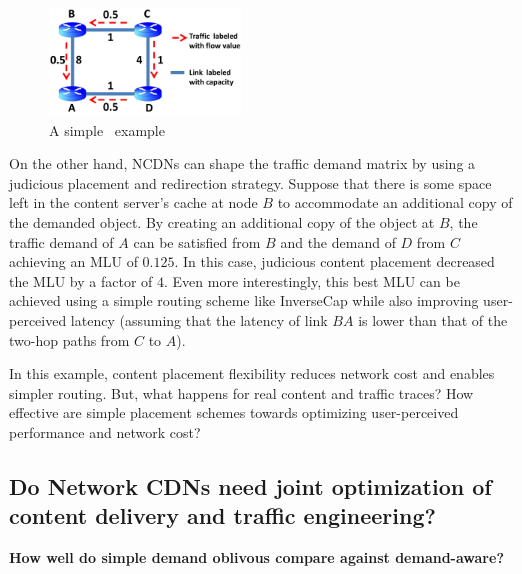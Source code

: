 \begin{figure}[h]
	\centering
	\includegraphics[width=2in]{ncdnpaper/ncdn-example}
	\caption{A simple \ncp\ example}
	\vspace{-.3in}
	\label{fig:NetworkExample}
\end{figure}


On the other hand, NCDNs can shape the traffic demand matrix by using a judicious placement and redirection strategy. Suppose that there is some space left in the content server's cache at node $B$ to accommodate an additional copy of the demanded object. By creating an additional copy of the object at $B$, the traffic demand of $A$ can be satisfied from $B$ and the demand of $D$ from $C$ achieving an MLU of $0.125$. In this case, judicious content placement decreased the MLU by a factor of $4$. Even more interestingly, this best MLU can be achieved using a simple routing scheme like InverseCap while also improving user-perceived latency (assuming that the latency of link $BA$ is lower than that of the two-hop paths from $C$ to $A$).

In this example, content placement flexibility reduces network cost and enables simpler routing. But, what happens for real content and traffic traces? How effective are simple placement schemes towards optimizing user-perceived performance and network cost?






\subsection{Do Network CDNs need joint optimization of content delivery and traffic engineering?}



\textbf{How well do simple demand oblivous compare against demand-aware?}

